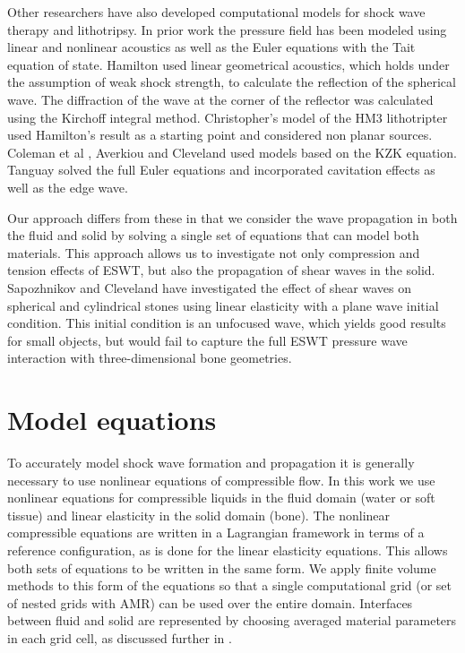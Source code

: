 \documentclass{article}
\begin{document}
Other researchers have also developed computational models for 
shock wave therapy and lithotripsy.
In prior work the pressure field has been modeled using linear and
nonlinear acoustics as well as the Euler equations with the Tait
equation of state.  Hamilton \cite{hamilton} used linear geometrical
acoustics, which holds under the assumption of weak shock strength,
to calculate the reflection of the spherical wave.  The diffraction
of the wave at the corner of the reflector was calculated using the
Kirchoff integral method.  Christopher's \cite{christopher_hm3}
model of the HM3 lithotripter used Hamilton's result as a starting
point and considered non planar sources.  Coleman et al \cite{coleman},
Averkiou and Cleveland \cite{cleveland_averkiou} used models based
on the KZK equation.  Tanguay \cite{tanguay} solved the full Euler
equations and incorporated cavitation effects as well as the edge
wave.

Our approach differs from these in that we consider the wave
propagation in both the fluid and solid by solving a single set of
equations that can model both materials.  This approach allows us
to investigate not only compression and tension effects of ESWT,
but also the propagation of shear waves in the solid.  Sapozhnikov
and Cleveland \cite{oleg_cleveland} have investigated the effect
of shear waves on spherical and cylindrical stones using linear
elasticity with a plane wave initial condition.  This initial
condition is an unfocused wave, which yields good results for small
objects, but would fail to capture the full ESWT pressure wave
interaction with three-dimensional bone geometries.



\section{Model equations}
\label{sec:model_equations}
To accurately model shock wave formation and propagation it is generally necessary to use nonlinear
equations of  compressible flow.  
In this work we use nonlinear equations for compressible liquids in the
fluid domain (water or soft tissue) and linear elasticity in the solid domain (bone).
The nonlinear compressible equations are written in a Lagrangian framework in terms of a reference
configuration, as is done for the linear elasticity equations.  This allows both sets of equations to be
written in the same form.  We apply finite volume methods to this form of the equations so that a single
computational grid (or set of nested grids with AMR) 
can be used over the entire domain.  Interfaces between fluid and
solid are represented by choosing averaged material parameters in each grid cell, as discussed further 
in .  
\end{document}
